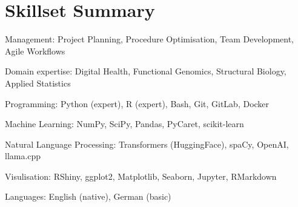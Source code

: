 \section{Skillset Summary}
\begin{itemize*}
 \item Management: Project Planning, Procedure Optimisation, Team Development, Agile Workflows
 \item Domain expertise: Digital Health, Functional Genomics, Structural Biology, Applied Statistics
 \item Programming: Python (expert), R (expert), Bash, Git, GitLab, Docker
 \item Machine Learning: NumPy, SciPy, Pandas, PyCaret, scikit-learn
 \item Natural Language Processing: Transformers (HuggingFace), spaCy, OpenAI, llama.cpp
 \item Visulisation: RShiny, ggplot2, Matplotlib, Seaborn, Jupyter, RMarkdown
 \item Languages: English (native), German (basic)
\end{itemize*}
